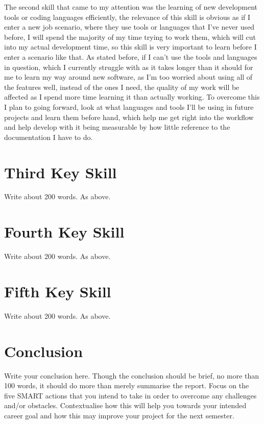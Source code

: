 \documentclass{scrartcl}
\begin{document}
The second skill that came to my attention was the learning of new development tools or coding languages efficiently, the relevance of this skill is obvious as if I enter a new job scenario, where they use tools or languages that I've never used before, I will spend the majority of my time trying to work them, which will cut into my actual development time, so this skill is very important to learn before I enter a scenario like that.  As stated before, if I can't use the tools and languages in question, which I currently struggle with as it takes longer than it should for me to learn my way around new software, as I'm too worried about using all of the features well, instead of the ones I need, the quality of my work will be affected as I spend more time learning it than actually working. To overcome this I plan to going forward, look at what languages and tools I'll be using in future projects and learn them before hand, which help me get right into the workflow and help develop with it being measurable by how little reference to the documentation I have to do. 


\section{Third Key Skill}

Write about 200 words. As above.

\section{Fourth Key Skill}

Write about 200 words. As above.

\section{Fifth Key Skill}

Write about 200 words. As above.

\section{Conclusion}

Write your conclusion here. Though the conclusion should be brief, no more than 100 words, it should do more than merely summarise the report. Focus on the five SMART actions that you intend to take in order to overcome any challenges and/or obstacles. Contextualise how this will help you towards your intended career goal and how this may improve your project for the next semester.



\end{document}
